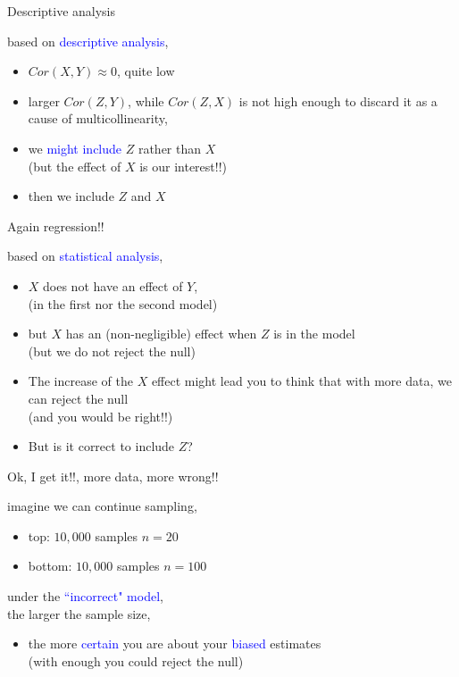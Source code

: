 %
%
\begin{lhframe}[rhgraphic={\texttt{[image: collider2\_panel.pdf]}}]
	{Descriptive analysis}
	
	based on \textcolor{blue}{descriptive analysis},
	\begin{itemize}
		\item $Cor(X, Y) \approx 0$, quite low
		\item larger $Cor(Z,Y)$, while $Cor(Z,X)$ is not high enough to discard it as a cause of multicollinearity,
		\item we \textcolor{blue}{might include} $Z$ rather than $X$ \\
		{\small (but the effect of $X$ is our interest!!)}
		\item then we include $Z$ and $X$
	\end{itemize}
\end{lhframe}
%
%
\begin{lhframe}[rhgraphic={\texttt{[image: collider2\_reg.png]}}]
	{Again regression!!}
	
	based on \textcolor{blue}{statistical analysis},
	\begin{itemize}
		\item $X$ does not have an effect of $Y$, \\
		{\small (in the first nor the second model)}
		\item but $X$ has an (non-negligible) effect when $Z$ is in the model \\
		{\small (but we do not reject the null)}
		\item The increase of the $X$ effect might lead you to think that with more data, we can reject the null \\
		{\small (and you would be right!!)} \\
		\item But is it correct to include $Z$?
	\end{itemize}
\end{lhframe}
%
%
\begin{lhframe}[rhgraphic={\texttt{[image: collider2\_samplesize.pdf]}}]
	{Ok, I get it!!, more data, more wrong!!}
	
	imagine we can continue sampling,
	\begin{itemize}
		\item top: $10,000$ samples $n=20$
		\item bottom: $10,000$ samples $n=100$
	\end{itemize}
	
	under the \textcolor{blue}{``incorrect" model}, \\
	the larger the sample size,
	\begin{itemize}
		\item the more \textcolor{blue}{certain} you are about your \textcolor{blue}{biased} estimates \\
		{\small (with enough you could reject the null)}
	\end{itemize}
\end{lhframe}
